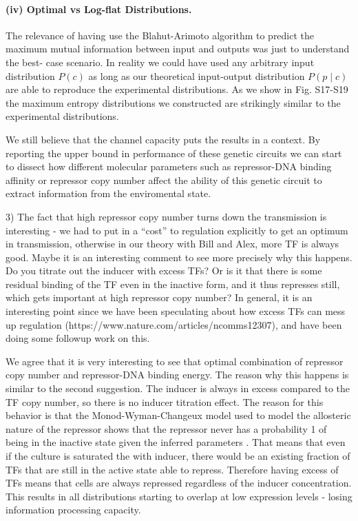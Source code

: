 \paragraph{(iv) Optimal vs Log-flat Distributions.}
The relevance of having use the Blahut-Arimoto algorithm to predict the maximum
mutual information between input and outputs was just to understand the best-
case scenario. In reality we could have used any arbitrary input distribution
$P(c)$ as long as our theoretical input-output distribution $P(p \mid c)$ are
able to reproduce the experimental distributions. As we show in Fig. S17-S19 the
maximum entropy distributions we constructed are strikingly similar to the
experimental distributions.

We still believe that the channel capacity puts the results in a context. By
reporting the upper bound in performance of these genetic circuits we can start
to dissect how different molecular parameters such as repressor-DNA binding
affinity or repressor copy number affect the ability of this genetic circuit to
extract information from the enviromental state.

\begin{tcolorbox}
3) The fact that high repressor copy number turns down the transmission is
interesting - we had to put in a “cost” to regulation explicitly to get an
optimum in transmission, otherwise in our theory with Bill and Alex, more TF is
always good. Maybe it is an interesting comment to see more precisely why this
happens. Do you titrate out the inducer with excess TFs? Or is it that there is
some residual binding of the TF even in the inactive form, and it thus represses
still, which gets important at high repressor copy number? In general, it is an
interesting point since we have been speculating about how excess TFs can mess
up regulation (https://www.nature.com/articles/ncomms12307), and have been doing
some followup work on this.
\end{tcolorbox}

We agree that it is very interesting to see that optimal combination of
repressor copy number and repressor-DNA binding energy. The reason why this
happens is similar to the second suggestion. The inducer is always in excess
compared to the TF copy number, so there is no inducer titration effect. The
reason for this behavior is that the Monod-Wyman-Changeux model used to model
the allosteric nature of the repressor shows that the repressor never has a
probability 1 of being in the inactive state given the inferred parameters
\cite{Razo-Mejia2018}. That means that even if the culture is saturated the
with inducer, there would be an existing fraction of TFs that are still in the
active state able to repress. Therefore having excess of TFs means that cells
are always repressed regardless of the inducer concentration. This results in
all distributions starting to overlap at low expression levels - losing
information processing capacity.


